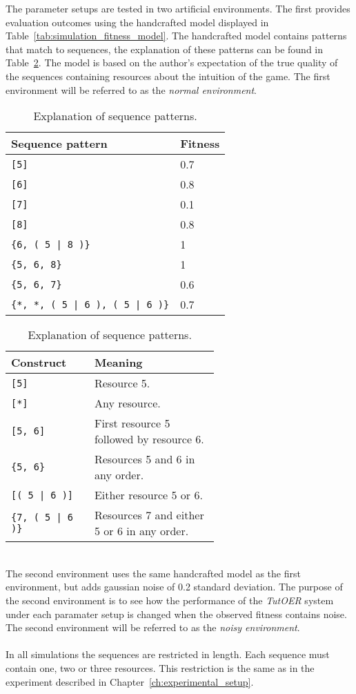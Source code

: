 \noindent
The parameter setups are tested in two artificial environments. The first
provides evaluation outcomes using the handcrafted model displayed in
Table~\ref{tab:simulation_fitness_model}. The handcrafted model contains
patterns that match to sequences, the explanation of these patterns can be
found in Table~\ref{tab:simulation_fitness_model_explanation}.
The model is based on the author's expectation of the true quality of the
sequences containing resources about the intuition of the game. The first
environment will be referred to as the \emph{normal environment}.\\
\begin{table}[h]
\begin{minipage}[t]{0.48\linewidth}
\caption{Fitness values for each sequence.}
\label{tab:simulation_fitness_model}
\begin{tabular}[ht]{ll}\hline
	Sequence pattern & Fitness \\\hline
	\verb![5]! & 0.7 \\
	\verb![6]! & 0.8 \\
	\verb![7]! & 0.1 \\
	\verb![8]! & 0.8 \\
	\verb!{6, ( 5 | 8 )}! & 1 \\
	\verb!{5, 6, 8}! & 1 \\
	\verb!{5, 6, 7}! & 0.6 \\
	\verb!{*, *, ( 5 | 6 ), ( 5 | 6 )}! & 0.7\\
\end{tabular}
\end{minipage}
\hfill
\begin{minipage}[t]{0.51\linewidth}
\caption{Explanation of sequence patterns.}
\label{tab:simulation_fitness_model_explanation}
\begin{tabular}[ht]{lp{0.6\linewidth}}\hline
	Construct &  Meaning \\\hline
	\verb![5]! & Resource 5.\\
	\verb![*]! & Any resource.\\
	\verb![5, 6]! & First resource 5 followed by resource 6.\\
	\verb!{5, 6}! & Resources 5 and 6 in any order.\\
	\verb![( 5 | 6 )]! & Either resource 5 or 6.\\
	\verb!{7, ( 5 | 6 )}! & Resources 7 and either 5 or 6 in any order.\\
\end{tabular}
\end{minipage}
\end{table}\\
\noindent
The second environment uses the same handcrafted model as the first
environment, but adds gaussian noise of 0.2 standard deviation. The purpose of
the second environment is to see how the performance of the \emph{TutOER}
system under each paramater setup is changed when the observed fitness contains
noise. The second environment will be referred to as the \emph{noisy
environment}.\\\\
\noindent
In all simulations the sequences are restricted in length. Each sequence must
contain one, two or three resources. This restriction is the same as in the
experiment described in Chapter~\ref{ch:experimental_setup}.
